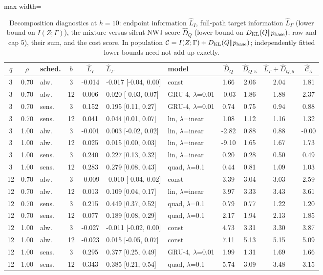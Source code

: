 \begin{table}[htbp]
\centering
\scriptsize
\caption{Decomposition diagnostics at $h=10$: endpoint information $\widehat L_I$, full-path target information $\widehat L_\Gamma$ (lower bound on $I(Z;\Gamma)$), the mixture-versus-silent NWJ score $\widehat D_Q$ (lower bound on $D_{\rm KL}(Q\Vert p_{\rm base})$; raw and cap 5), their sum, and the cost score. In population $\mathcal C = I(Z;\Gamma)+D_{\rm KL}(Q\Vert p_{\rm base})$; independently fitted lower bounds need not add up exactly.}\label{tab:decomposition}
\begin{adjustbox}{max width=\textwidth}
\begin{tabular}{cclc c l l cc cc}
\toprule
$q$ & $\rho$ & sched. & $b$ & $\widehat L_I$ & $\widehat L_{\Gamma}$ & model & $\widehat D_Q$ & $\widehat D_{Q,5}$ & $\widehat L_\Gamma+\widehat D_{Q,5}$ & $\widehat{\mathcal C}_5$ \\
\midrule
3 & 0.70 & alw. & 3 & -0.014 & -0.017 [-0.04, 0.00] & const & 1.66 & 2.06 & 2.04 & 1.81 \\
3 & 0.70 & alw. & 12 & 0.006 & 0.020 [-0.03, 0.07] & GRU-4, $\lambda$=0.01 & -0.03 & 1.86 & 1.88 & 2.37 \\
3 & 0.70 & sens. & 3 & 0.152 & 0.195 [0.11, 0.27] & GRU-4, $\lambda$=0.01 & 0.74 & 0.75 & 0.94 & 0.88 \\
3 & 0.70 & sens. & 12 & 0.041 & 0.044 [0.01, 0.07] & lin, $\lambda$=inear & 1.08 & 1.12 & 1.16 & 1.32 \\
3 & 1.00 & alw. & 3 & -0.001 & 0.003 [-0.02, 0.02] & lin, $\lambda$=inear & -2.82 & 0.88 & 0.88 & -0.00 \\
3 & 1.00 & alw. & 12 & 0.025 & 0.015 [0.00, 0.03] & lin, $\lambda$=inear & -9.10 & 1.65 & 1.67 & 1.73 \\
3 & 1.00 & sens. & 3 & 0.240 & 0.227 [0.13, 0.32] & lin, $\lambda$=inear & 0.20 & 0.28 & 0.50 & 0.49 \\
3 & 1.00 & sens. & 12 & 0.283 & 0.279 [0.08, 0.43] & quad, $\lambda$=0.1 & 0.44 & 0.81 & 1.09 & 1.03 \\
12 & 0.70 & alw. & 3 & -0.009 & -0.010 [-0.04, 0.02] & const & 3.39 & 3.04 & 3.03 & 2.59 \\
12 & 0.70 & alw. & 12 & 0.013 & 0.109 [0.04, 0.17] & lin, $\lambda$=inear & 3.97 & 3.33 & 3.43 & 3.61 \\
12 & 0.70 & sens. & 3 & 0.215 & 0.449 [0.37, 0.52] & quad, $\lambda$=0.1 & 0.79 & 0.77 & 1.22 & 1.20 \\
12 & 0.70 & sens. & 12 & 0.077 & 0.189 [0.08, 0.29] & quad, $\lambda$=0.1 & 2.17 & 1.94 & 2.13 & 1.85 \\
12 & 1.00 & alw. & 3 & -0.027 & -0.011 [-0.02, 0.00] & const & 4.73 & 3.31 & 3.30 & 3.87 \\
12 & 1.00 & alw. & 12 & -0.023 & 0.015 [-0.05, 0.07] & const & 7.11 & 5.13 & 5.15 & 5.09 \\
12 & 1.00 & sens. & 3 & 0.295 & 0.377 [0.25, 0.49] & GRU-4, $\lambda$=0.01 & 1.99 & 1.31 & 1.69 & 1.66 \\
12 & 1.00 & sens. & 12 & 0.343 & 0.385 [0.21, 0.54] & quad, $\lambda$=0.1 & 5.74 & 3.09 & 3.48 & 3.15 \\
\bottomrule
\end{tabular}
\end{adjustbox}
\end{table}